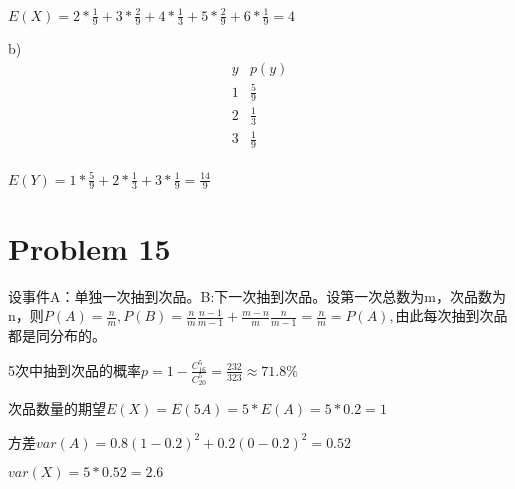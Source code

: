 \documentclass{article}
\begin{document}
$E(X)=2*\frac{1}{9}+3*\frac{2}{9}+4*\frac{1}{3}+5*\frac{2}{9}+6*\frac{1}{9}=4$

b)
\begin{equation}
    \nonumber
    \begin{array}{c|c}
        \hline y & p(y) \\
        \hline 1 & \frac{5}{9} \\
        \hline 2 & \frac{1}{3} \\
        \hline 3 & \frac{1}{9} \\
    \end{array}
\end{equation}

$E(Y)=1*\frac{5}{9}+2*\frac{1}{3}+3*\frac{1}{9}=\frac{14}{9}$

\section*{Problem 15}
设事件A：单独一次抽到次品。B:下一次抽到次品。设第一次总数为m，次品数为n，则$P(A)=\frac{n}{m},P(B)=\frac{n}{m}\frac{n-1}{m-1}+\frac{m-n}{m}\frac{n}{m-1}=\frac{n}{m}=P(A),$由此每次抽到次品都是同分布的。

5次中抽到次品的概率$p=1-\frac{C_{16}^{5}}{C_{20}^{5}}=\frac{232}{323}\approx 71.8\%$

次品数量的期望$E(X) = E(5A) = 5*E(A) = 5*0.2 = 1$

方差$var(A) = 0.8(1-0.2)^2+0.2(0-0.2)^2 = 0.52$

$var(X)=5*0.52=2.6$
\end{document}
